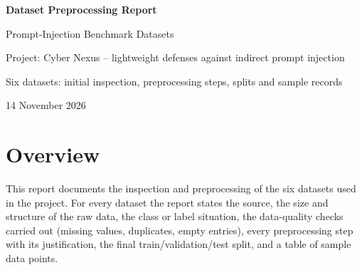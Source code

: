 \documentclass[11pt,a4paper]{article}
\begin{document}
\begin{titlepage}
\centering\vspace*{5cm}
{\Huge\bfseries\color{accent} Dataset Preprocessing Report\par}
\vspace{0.8cm}
{\Large Prompt-Injection Benchmark Datasets\par}
\vspace{0.6cm}
{\large Project: Cyber Nexus -- lightweight defenses against indirect prompt injection\par}
\vspace{2cm}
{\large Six datasets: initial inspection, preprocessing steps, splits and sample records\par}
\vspace{3cm}
{\large 14 November 2026\par}
\end{titlepage}

\tableofcontents
\newpage

\section{Overview}
This report documents the inspection and preprocessing of the six datasets used in the project. For every dataset the report states the source, the size and structure of the raw data, the class or label situation, the data-quality checks carried out (missing values, duplicates, empty entries), every preprocessing step with its justification, the final train/validation/test split, and a table of sample data points.
\end{document}
